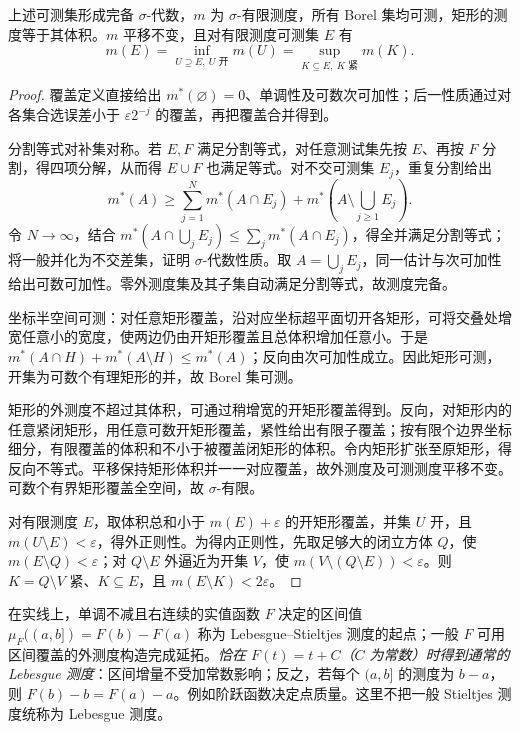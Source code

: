 \begin{proposition}[外测度构造的基本性质]\label{prop:y0-lebesgue-construction}
上述可测集形成完备 $\sigma$-代数，$m$ 为 $\sigma$-有限测度，所有 Borel 集均可测，矩形的测度等于其体积。$m$ 平移不变，且对有限测度可测集 $E$ 有
\[
 m(E)=\inf_{U\supseteq E,\ U\text{ 开}}m(U)
     =\sup_{K\subseteq E,\ K\text{ 紧}}m(K).
\]
\end{proposition}
\begin{proof}
覆盖定义直接给出 $m^*(\varnothing)=0$、单调性及可数次可加性；后一性质通过对各集合选误差小于 $\varepsilon2^{-j}$ 的覆盖，再把覆盖合并得到。

分割等式对补集对称。若 $E,F$ 满足分割等式，对任意测试集先按 $E$、再按 $F$ 分割，得四项分解，从而得 $E\cup F$ 也满足等式。对不交可测集 $E_j$，重复分割给出
\[
 m^*(A)\ge\sum_{j=1}^Nm^*(A\cap E_j)
                   +m^*\left(A\setminus\bigcup_{j\ge1}E_j\right).
\]
令 $N\to\infty$，结合 $m^*(A\cap\bigcup_jE_j)\le\sum_jm^*(A\cap E_j)$，得全并满足分割等式；将一般并化为不交差集，证明 $\sigma$-代数性质。取 $A=\bigcup_jE_j$，同一估计与次可加性给出可数可加性。零外测度集及其子集自动满足分割等式，故测度完备。

坐标半空间可测：对任意矩形覆盖，沿对应坐标超平面切开各矩形，可将交叠处增宽任意小的宽度，使两边仍由开矩形覆盖且总体积增加任意小。于是 $m^*(A\cap H)+m^*(A\setminus H)\le m^*(A)$；反向由次可加性成立。因此矩形可测，开集为可数个有理矩形的并，故 Borel 集可测。

矩形的外测度不超过其体积，可通过稍增宽的开矩形覆盖得到。反向，对矩形内的任意紧闭矩形，用任意可数开矩形覆盖，紧性给出有限子覆盖；按有限个边界坐标细分，有限覆盖的体积和不小于被覆盖闭矩形的体积。令内矩形扩张至原矩形，得反向不等式。平移保持矩形体积并一一对应覆盖，故外测度及可测测度平移不变。可数个有界矩形覆盖全空间，故 $\sigma$-有限。

对有限测度 $E$，取体积总和小于 $m(E)+\varepsilon$ 的开矩形覆盖，并集 $U$ 开，且 $m(U\setminus E)<\varepsilon$，得外正则性。为得内正则性，先取足够大的闭立方体 $Q$，使 $m(E\setminus Q)<\varepsilon$；对 $Q\setminus E$ 外逼近为开集 $V$，使 $m(V\setminus(Q\setminus E))<\varepsilon$。则 $K=Q\setminus V$ 紧、$K\subseteq E$，且 $m(E\setminus K)<2\varepsilon$。
\end{proof}

在实线上，单调不减且右连续的实值函数 $F$ 决定的区间值 $\mu_F((a,b])=F(b)-F(a)$ 称为 Lebesgue--Stieltjes 测度的起点；一般 $F$ 可用区间覆盖的外测度构造完成延拓。\emph{恰在 $F(t)=t+C$（$C$ 为常数）时得到通常的 Lebesgue 测度}：区间增量不受加常数影响；反之，若每个 $(a,b]$ 的测度为 $b-a$，则 $F(b)-b=F(a)-a$。例如阶跃函数决定点质量。这里不把一般 Stieltjes 测度统称为 Lebesgue 测度。

